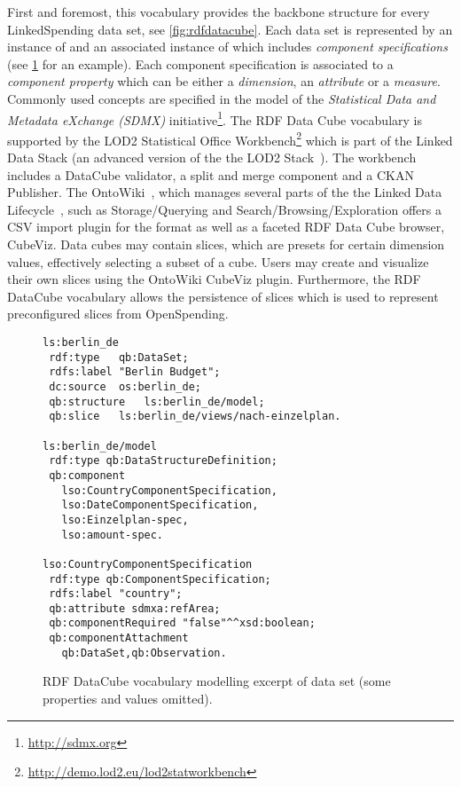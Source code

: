 \documentclass[sw]{iosart2x}
\begin{document}
First and foremost, this vocabulary provides the backbone structure for every LinkedSpending data set, see \cref{fig:rdfdatacube}.
Each data set is represented by an instance of  and an associated instance of  which includes \emph{component specifications} (see \cref{fig:modellingexample} for an example).
Each component specification is associated to a \emph{component property} which can be either a \emph{dimension}, an \emph{attribute} or a \emph{measure}.
Commonly used concepts are specified in the model of the \emph{Statistical Data and Metadata eXchange (SDMX)} initiative\footnote{\url{http://sdmx.org}}.
The RDF Data Cube vocabulary  is supported by the LOD2 Statistical Office Workbench\footnote{\url{http://demo.lod2.eu/lod2statworkbench}} which is part of the Linked Data Stack (an advanced version of the the LOD2 Stack~\cite{Auer+ISWC-2012}).
The workbench includes a DataCube validator, a split and merge component and a CKAN Publisher.
The OntoWiki~\cite{ontowiki_www}, which manages several parts of the the Linked Data Lifecycle~\cite{Auer+ISWC-2012}, such as Storage/Querying and Search/Browsing/Exploration offers a CSV import plugin for the format as well as a faceted RDF Data Cube browser, CubeViz.
Data cubes may contain slices, which are presets for certain dimension values, effectively selecting a subset of a cube. Users may create and visualize their own slices using the OntoWiki CubeViz plugin. Furthermore, the RDF DataCube vocabulary allows the persistence of slices which is used to represent preconfigured slices from OpenSpending.



\begin{figure}
\footnotesize
\begin{lstlisting}[language=ttl]
ls:berlin_de
 rdf:type	qb:DataSet;
 rdfs:label	"Berlin Budget";
 dc:source	os:berlin_de;
 qb:structure	ls:berlin_de/model;
 qb:slice	ls:berlin_de/views/nach-einzelplan.
 
ls:berlin_de/model
 rdf:type qb:DataStructureDefinition;
 qb:component
   lso:CountryComponentSpecification,
   lso:DateComponentSpecification,
   lso:Einzelplan-spec,
   lso:amount-spec.
   
lso:CountryComponentSpecification 
 rdf:type qb:ComponentSpecification;
 rdfs:label "country";
 qb:attribute sdmxa:refArea; 
 qb:componentRequired "false"^^xsd:boolean;
 qb:componentAttachment
   qb:DataSet,qb:Observation.
\end{lstlisting}
\caption{RDF DataCube vocabulary modelling excerpt of data set  (some properties and values omitted).}
\label{fig:modellingexample}
\end{figure}
\end{document}
